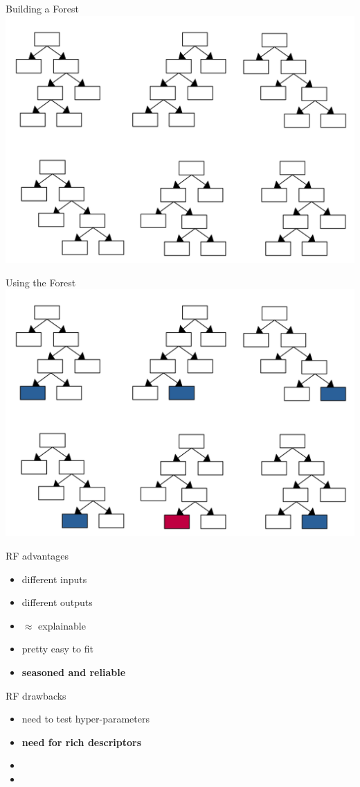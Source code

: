 \documentclass{irdbeamer}
\begin{document}
\begin{frame}{Building a Forest}
\centering
    \includegraphics[width=.7\textwidth]{./figs/schemas/entire-forest.png}%
\end{frame}

\begin{frame}{Using the Forest}
\centering
    \includegraphics[width=.7\textwidth]{./figs/schemas/entire-forest-usage.png}%
\end{frame}

\begin{frame}{RF advantages}
        \begin{itemize}
            \item<1-> different inputs
            \item<2-> different outputs
            \item<3-> $\approx$ explainable
            \item<4-> pretty easy to fit
            \item<5->[$\rightarrow$] \textbf{seasoned and reliable}
        \end{itemize}
\end{frame}

\begin{frame}{RF drawbacks}
        \begin{itemize}
            \item<1-> need to test hyper-parameters
            \item<2-> \textbf{need for rich descriptors}
            \item[] 
            \item[] 
        \end{itemize}
\end{frame}
\end{document}
